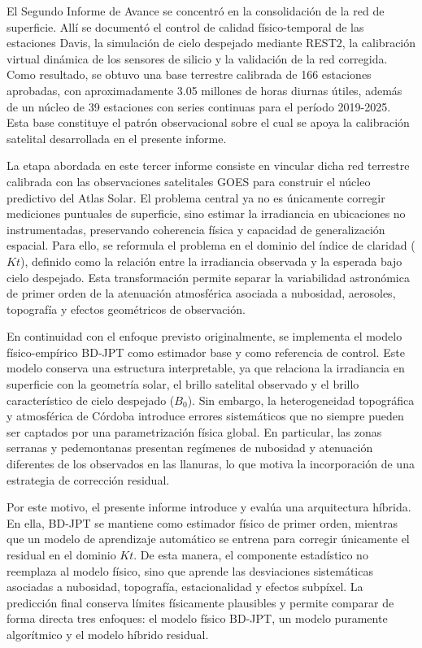 \documentclass[../main.tex]{subfiles}
\begin{document}
El Segundo Informe de Avance se concentró en la consolidación de la red de superficie. Allí se documentó el control de calidad físico-temporal de las estaciones Davis, la simulación de cielo despejado mediante REST2, la calibración virtual dinámica de los sensores de silicio y la validación de la red corregida. Como resultado, se obtuvo una base terrestre calibrada de 166 estaciones aprobadas, con aproximadamente 3.05 millones de horas diurnas útiles, además de un núcleo de 39 estaciones con series continuas para el período 2019-2025. Esta base constituye el patrón observacional sobre el cual se apoya la calibración satelital desarrollada en el presente informe.

La etapa abordada en este tercer informe consiste en vincular dicha red terrestre calibrada con las observaciones satelitales GOES para construir el núcleo predictivo del Atlas Solar. El problema central ya no es únicamente corregir mediciones puntuales de superficie, sino estimar la irradiancia en ubicaciones no instrumentadas, preservando coherencia física y capacidad de generalización espacial. Para ello, se reformula el problema en el dominio del índice de claridad ($Kt$), definido como la relación entre la irradiancia observada y la esperada bajo cielo despejado. Esta transformación permite separar la variabilidad astronómica de primer orden de la atenuación atmosférica asociada a nubosidad, aerosoles, topografía y efectos geométricos de observación.

En continuidad con el enfoque previsto originalmente, se implementa el modelo físico-empírico BD-JPT como estimador base y como referencia de control. Este modelo conserva una estructura interpretable, ya que relaciona la irradiancia en superficie con la geometría solar, el brillo satelital observado y el brillo característico de cielo despejado ($B_0$). Sin embargo, la heterogeneidad topográfica y atmosférica de Córdoba introduce errores sistemáticos que no siempre pueden ser captados por una parametrización física global. En particular, las zonas serranas y pedemontanas presentan regímenes de nubosidad y atenuación diferentes de los observados en las llanuras, lo que motiva la incorporación de una estrategia de corrección residual.

Por este motivo, el presente informe introduce y evalúa una arquitectura híbrida. En ella, BD-JPT se mantiene como estimador físico de primer orden, mientras que un modelo de aprendizaje automático se entrena para corregir únicamente el residual en el dominio $Kt$. De esta manera, el componente estadístico no reemplaza al modelo físico, sino que aprende las desviaciones sistemáticas asociadas a nubosidad, topografía, estacionalidad y efectos subpíxel. La predicción final conserva límites físicamente plausibles y permite comparar de forma directa tres enfoques: el modelo físico BD-JPT, un modelo puramente algorítmico y el modelo híbrido residual.
\end{document}
